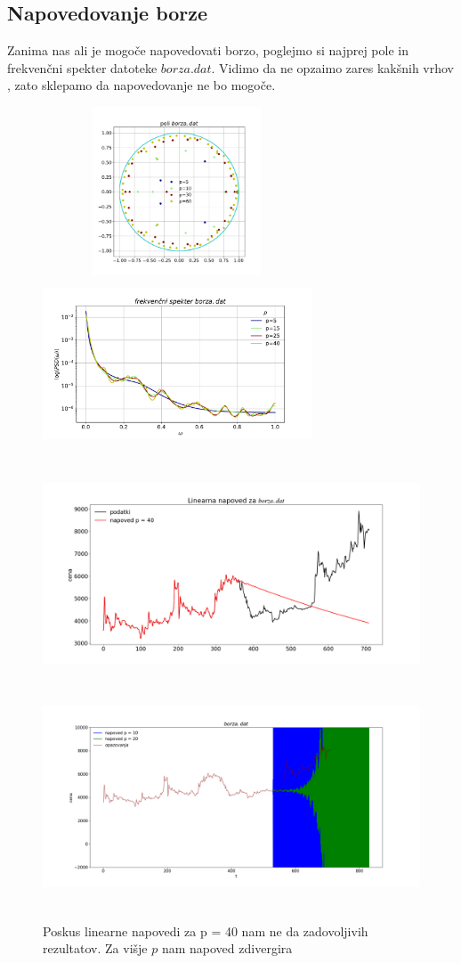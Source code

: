 \documentclass[11pt, a4paper]{article}
\begin{document}
\subsection{Napovedovanje borze}
Zanima nas ali je mogoče napovedovati borzo, poglejmo si najprej pole in frekvenčni spekter datoteke $borza.dat$. Vidimo da ne opzaimo zares kakšnih vrhov , zato sklepamo da napovedovanje ne bo mogoče.
\begin{figure}[H]
\centering
  \includegraphics[width=8cm,height=5cm]{linearna_napoved3.pdf}
  \includegraphics[width=8cm,height=5cm]{linearna_napoved4.pdf}

\end{figure}
\begin{figure}[H]
\centering
  \includegraphics[width=16cm,height=6.5cm]{linearna_napoved5.png}
 \includegraphics[width=16cm,height=6.5cm]{divergira.png}
\caption{Poskus linearne napovedi za p = 40 nam ne da zadovoljivih rezultatov. Za višje $p$ nam napoved zdivergira}
\end{figure}
\end{document}
